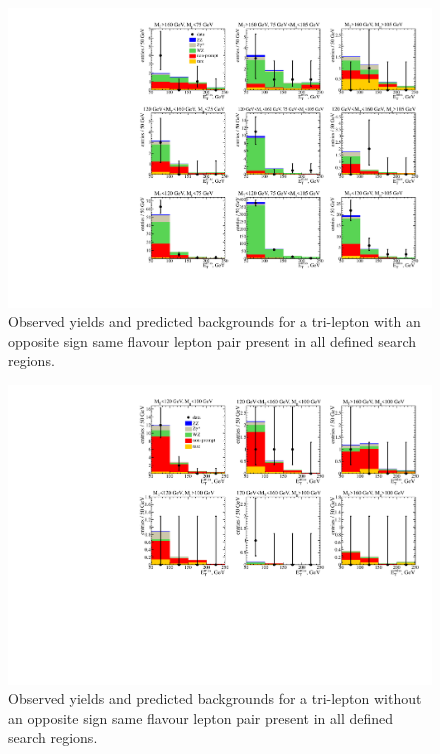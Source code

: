 \begin{figure}[htp]
\begin{center}
\includegraphics[width=1.0\textwidth]{plots/ossf1tau0.pdf}
\caption{Observed yields and predicted backgrounds for a tri-lepton with an opposite sign same flavour lepton pair present in all defined search regions.}
\label{fig:OSSF1tau0}
\end{center}
\end{figure}
\begin{figure}[htp]
\begin{center}
\includegraphics[width=1.0\textwidth]{plots/ossf0tau0.pdf}
\caption{Observed yields and predicted backgrounds for a tri-lepton without an opposite sign same flavour lepton pair present in all defined search regions.}
\label{fig:OSSF0tau0}
\end{center}
\end{figure}
